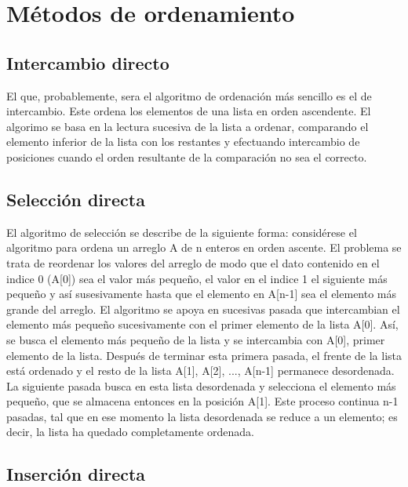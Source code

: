 \documentclass[12pt]{article}
\begin{document}
\section{M\'etodos de ordenamiento}

\subsection{Intercambio directo}

El que, probablemente, sera el algoritmo de ordenaci\'on m\'as sencillo es el de intercambio. Este ordena los elementos de una lista en orden ascendente. El algorimo se basa en la lectura sucesiva de la lista a ordenar, comparando el elemento inferior de la lista con los restantes y efectuando intercambio de posiciones cuando el orden resultante de la comparaci\'on no sea el correcto.

\subsection{Selecci\'on directa}

El algoritmo de selecci\'on se describe de la siguiente forma: consid\'erese el algoritmo para ordena un arreglo A de n enteros en orden ascente. El problema se trata de reordenar los valores del arreglo de modo que el dato contenido en el indice 0 (A[0]) sea el valor m\'as peque\~no, el valor en el indice 1 el siguiente m\'as pequeño y as\'{i} susesivamente hasta que el elemento en A[n-1] sea el elemento m\'as grande del arreglo. 
El algoritmo se apoya en sucesivas pasada que intercambian el elemento m\'as peque\~no sucesivamente con el primer elemento de la lista A[0]. As\'{i}, se busca el elemento m\'as peque\~no de la lista y se intercambia con A[0], primer elemento de la lista. Despu\'es de terminar esta primera pasada, el frente de la lista est\'a ordenado y el resto de la lista A[1], A[2], ..., A[n-1] permanece desordenada. La siguiente pasada busca en esta lista desordenada y selecciona el elemento m\'as peque\~no, que se almacena entonces en la posici\'on A[1]. Este proceso continua n-1 pasadas, tal que en ese momento la lista desordenada se reduce a un elemento; es decir, la lista ha quedado completamente ordenada.

\subsection{Inserci\'on directa}
\end{document}
